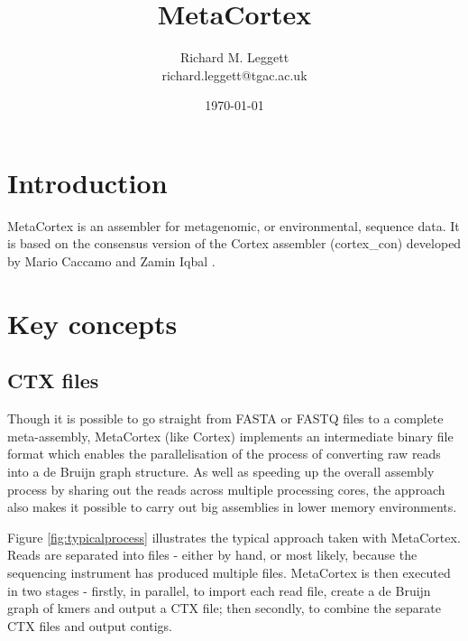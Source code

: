 \documentclass[a4paper,11pt,oneside]{article}
\begin{document}
\author{Richard M. Leggett\\richard.leggett@tgac.ac.uk}
\title{MetaCortex}
\date{\today}
\maketitle

\section{Introduction}

MetaCortex is an assembler for metagenomic, or environmental, sequence data. It is based on the consensus version of the Cortex assembler (cortex\_con) developed by Mario Caccamo and Zamin Iqbal \cite{iqbal2012}.
 
\section{Key concepts}

\subsection{CTX files}

Though it is possible to go straight from FASTA or FASTQ files to a complete meta-assembly, MetaCortex (like Cortex) implements an intermediate binary file format which enables the parallelisation of the process of converting raw reads into a de Bruijn graph structure. As well as speeding up the overall assembly process by sharing out the reads across multiple processing cores, the approach also makes it possible to carry out big assemblies in lower memory environments.

Figure \ref{fig:typicalprocess} illustrates the typical approach taken with MetaCortex. Reads are separated into files - either by hand, or most likely, because the sequencing instrument has produced multiple files. MetaCortex is then executed in two stages - firstly, in parallel, to import each read file, create a de Bruijn graph of kmers and output a CTX file; then secondly, to combine the separate CTX files and output contigs.
\end{document}
